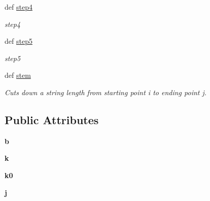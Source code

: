 \begin{DoxyCompactItemize}
def \hyperlink{classgographer_1_1utils_1_1_porter_stemmer_a7b1debd562a0d604600a134c987c9356}{step4}
\begin{DoxyCompactList}\small\item\em step4 \end{DoxyCompactList}\item 
def \hyperlink{classgographer_1_1utils_1_1_porter_stemmer_af98e1b965bd6aff51e4a64afed1c3f32}{step5}
\begin{DoxyCompactList}\small\item\em step5 \end{DoxyCompactList}\item 
def \hyperlink{classgographer_1_1utils_1_1_porter_stemmer_a5869c7373569999def125c4b2098b52e}{stem}
\begin{DoxyCompactList}\small\item\em Cuts down a string length from starting point i to ending point j. \end{DoxyCompactList}\end{DoxyCompactItemize}
\subsection*{Public Attributes}
\begin{DoxyCompactItemize}
\item 
\hypertarget{classgographer_1_1utils_1_1_porter_stemmer_a98cde62b5305a1347b0762d0e6bcbd84}{{\bfseries b}}\label{classgographer_1_1utils_1_1_porter_stemmer_a98cde62b5305a1347b0762d0e6bcbd84}

\item 
\hypertarget{classgographer_1_1utils_1_1_porter_stemmer_a2f97436f23364c1e16dc92c726da15ea}{{\bfseries k}}\label{classgographer_1_1utils_1_1_porter_stemmer_a2f97436f23364c1e16dc92c726da15ea}

\item 
\hypertarget{classgographer_1_1utils_1_1_porter_stemmer_a5fe8e6d4523818e167dbe33178b6675e}{{\bfseries k0}}\label{classgographer_1_1utils_1_1_porter_stemmer_a5fe8e6d4523818e167dbe33178b6675e}

\item 
\hypertarget{classgographer_1_1utils_1_1_porter_stemmer_a465006fcd8d5f5b40a9890c667c3e173}{{\bfseries j}}\label{classgographer_1_1utils_1_1_porter_stemmer_a465006fcd8d5f5b40a9890c667c3e173}

\end{DoxyCompactItemize}


